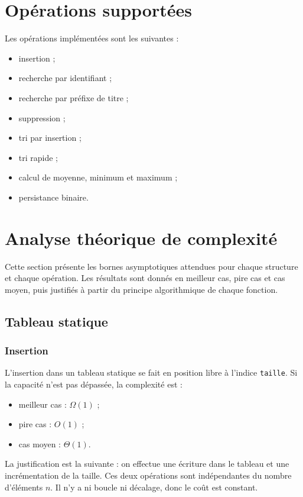 \documentclass[12pt,a4paper]{article}
\begin{document}
\section{Opérations supportées}
Les opérations implémentées sont les suivantes :
\begin{itemize}
  \item insertion ;
  \item recherche par identifiant ;
  \item recherche par préfixe de titre ;
  \item suppression ;
  \item tri par insertion ;
  \item tri rapide ;
  \item calcul de moyenne, minimum et maximum ;
  \item persistance binaire.
\end{itemize}

\section{Analyse théorique de complexité}
Cette section présente les bornes asymptotiques attendues pour chaque structure et chaque opération. Les résultats sont donnés en meilleur cas, pire cas et cas moyen, puis justifiés à partir du principe algorithmique de chaque fonction.

\subsection{Tableau statique}

\subsubsection{Insertion}
L’insertion dans un tableau statique se fait en position libre à l’indice \texttt{taille}. Si la capacité n’est pas dépassée, la complexité est :
\begin{itemize}
  \item meilleur cas : $\Omega(1)$ ;
  \item pire cas : $O(1)$ ;
  \item cas moyen : $\Theta(1)$.
\end{itemize}
La justification est la suivante : on effectue une écriture dans le tableau et une incrémentation de la taille. Ces deux opérations sont indépendantes du nombre d’éléments $n$. Il n’y a ni boucle ni décalage, donc le coût est constant.
\end{document}
